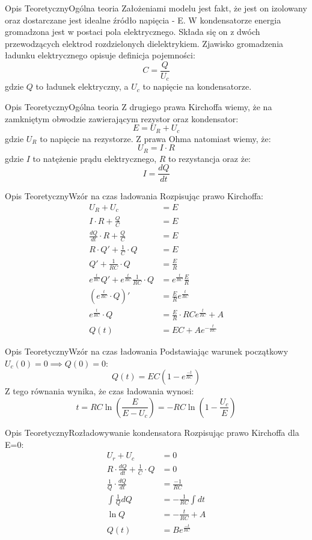 \documentclass[8pt]{beamer}
\begin{document}
\begin{frame}{Opis Teoretyczny}{Ogólna teoria}
    Założeniami modelu jest fakt, że jest on izolowany oraz dostarczane jest idealne źródło napięcia - E. W kondensatorze energia gromadzona jest w postaci pola elektrycznego. Składa się on z dwóch przewodzących elektrod rozdzielonych dielektrykiem. Zjawisko gromadzenia ładunku elektrycznego opisuje definicja pojemności:
	$$ C = \frac{Q}{U_c}$$
	gdzie $Q$ to ładunek elektryczny, a $U_c$ to napięcie na kondensatorze.
	
\end{frame}
\begin{frame}{Opis Teoretyczny}{Ogólna teoria}
    Z drugiego prawa Kirchoffa wiemy, że na zamkniętym obwodzie zawierającym rezystor oraz kondensator:
	$$ E = U_R + U_c$$
	gdzie $U_R$ to napięcie na rezystorze.
 Z prawa Ohma natomiast wiemy, że:
	$$ U_R = I \cdot R $$
	gdzie $I$ to natężenie prądu elektrycznego, $R$ to rezystancja oraz że:
	$$ I = \frac{dQ}{dt}$$
\end{frame}
\begin{frame}{Opis Teoretyczny}{Wzór na czas ładowania}
Rozpisując prawo Kirchoffa:
	\begin{align*}
		U_R + U_c &= E \\
		I \cdot R + \frac{Q}{C} &= E \\
		\frac{dQ}{dt} \cdot R + \frac{Q}{C} &= E \\
		R \cdot Q' + \frac{1}{C} \cdot Q &= E \\
		Q' + \frac{1}{RC} \cdot Q &= \frac{E}{R} \\
		e^{\frac{t}{RC}}Q' + e^{\frac{t}{RC}}\frac{1}{RC} \cdot Q &= e^{\frac{t}{RC}}\frac{E}{R} \\
		(e^{\frac{t}{RC}} \cdot Q)' &= \frac{E}{R} e^{\frac{t}{RC}} \\
		e^{\frac{t}{RC}} \cdot Q &= \frac{E}{R} \cdot RC e^{\frac{t}{RC}} + A\\
		Q(t) &= EC + Ae^{-\frac{t}{RC}} 
	\end{align*}
\end{frame}
\begin{frame}{Opis Teoretyczny}{Wzór na czas ładowania}
Podstawiając warunek początkowy $U_c(0) = 0 \implies Q(0) = 0$:
	$$Q(t) = EC(1-e^{\frac{-t}{RC}})$$ 
	Z tego równania wynika, że czas ładowania wynosi:
	$$t = RC \ln(\frac{E}{E - U_c}) = - RC \ln(1 - \frac{U_c}{E})$$
\end{frame}
\begin{frame}{Opis Teoretyczny}{Rozładowywanie kondensatora}
Rozpisując prawo Kirchoffa dla E=0:
	\begin{align*}
		U_r + U_c &= 0 \\
		R \cdot \frac{dQ}{dt} + \frac{1}{C} \cdot Q &= 0 \\
		\frac{1}{Q} \cdot \frac{dQ}{dt} &= \frac{-1}{RC} \\
		\int \frac{1}{Q} dQ &= -\frac{1}{RC} \int dt \\
		\ln Q &= -\frac{t}{RC} + A \\
		Q(t) &= Be^{\frac{-t}{RC}} \\		
	\end{align*}
\end{frame}
\end{document}
